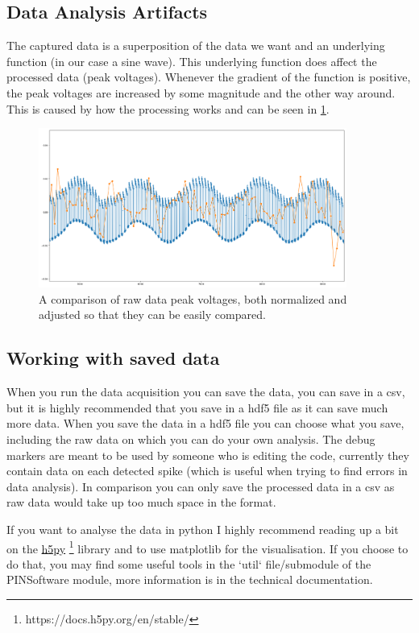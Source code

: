 \documentclass[a4paper, 10pt]{article}
\begin{document}
\subsection{Data Analysis Artifacts}
The captured data is a superposition of the data we want and an underlying function (in our case a sine wave).
This underlying function does affect the processed data (peak voltages).
Whenever the gradient of the function is positive, the peak voltages are increased by some magnitude and the other way around.
This is caused by how the processing works and can be seen in \cref{fig:soft-ys-pys-corr}.

\begin{figure}[H]
    \centering
    \includegraphics[width=0.9\textwidth]{./images/soft-ys-pys-corr.png}
    \caption{A comparison of raw data peak voltages, both normalized and adjusted so that they can be easily compared.}
    \label{fig:soft-ys-pys-corr}
\end{figure}

\subsection{Working with saved data}
When you run the data acquisition you can save the data, you can save in a csv, but it is highly recommended that you save in a hdf5 file as it can save much more data.
When you save the data in a hdf5 file you can choose what you save, including the raw data on which you can do your own analysis.
The debug markers are meant to be used by someone who is editing the code, currently they contain data on each detected spike (which is useful when trying to find errors in data analysis).
In comparison you can only save the processed data in a csv as raw data would take up too much space in the format.

If you want to analyse the data in python I highly recommend reading up a bit on the \href{https://docs.h5py.org/en/stable/}{h5py} \footnote{https://docs.h5py.org/en/stable/} library and to use matplotlib for the visualisation.
If you choose to do that, you may find some useful tools in the `util` file/submodule of the PINSoftware module, more information is in the technical documentation.
\end{document}
